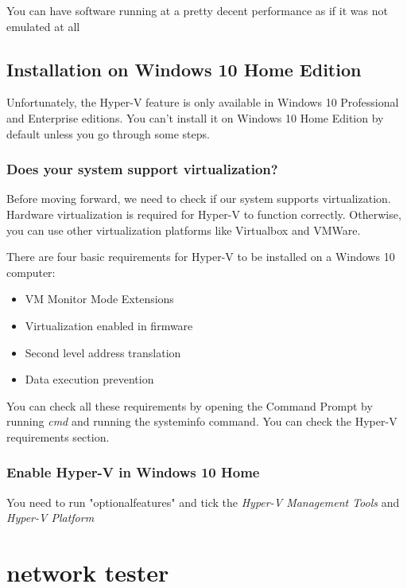 \documentclass[a4paper,12pt]{article}
\begin{document}
You can have software running at a pretty decent performance as if it was not emulated at all

\subsection {Installation on Windows 10 Home Edition}
Unfortunately, the Hyper-V feature is only available in Windows 10 Professional and Enterprise editions. You can’t install it on Windows 10 Home Edition by default unless you go through some steps.

\subsubsection {Does your system support virtualization?}
Before moving forward, we need to check if our system supports virtualization.
Hardware virtualization is required for Hyper-V to function correctly.
Otherwise, you can use other virtualization platforms like Virtualbox and VMWare.

There are four basic requirements for Hyper-V to be installed on a Windows 10 computer:

\begin{itemize}
\item VM Monitor Mode Extensions
\item Virtualization enabled in firmware
\item Second level address translation
\item Data execution prevention
\end{itemize}

You can check all these requirements by opening the Command Prompt by running \emph{cmd} and running the systeminfo command. You can check the Hyper-V requirements section.

\subsubsection{Enable Hyper-V in Windows 10 Home}
You need to run "optionalfeatures" and tick the \emph{Hyper-V Management Tools} and \emph{Hyper-V Platform}

\section{network tester}

\clearpage

\printindex
\end{document}
